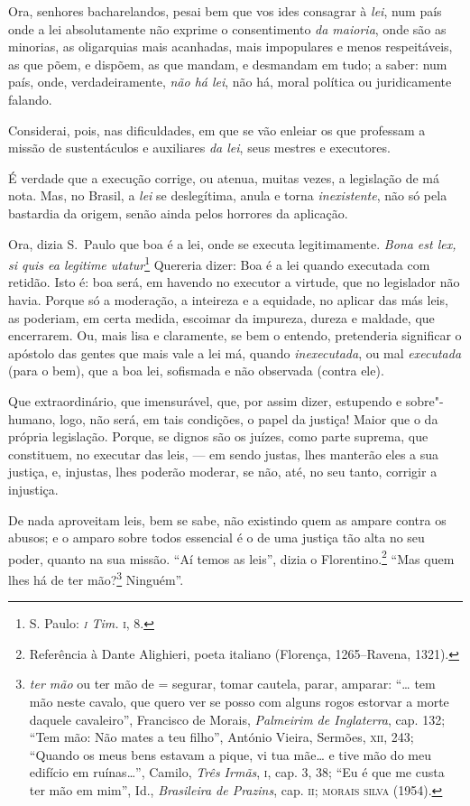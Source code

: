 Ora, senhores bacharelandos, pesai bem que vos ides consagrar à
\textit{lei}, num país onde a lei absolutamente não exprime o
consentimento \textit{da maioria}, onde são as minorias, as oligarquias
mais acanhadas, mais impopulares e menos respeitáveis, as que põem, e
dispõem, as que mandam, e desmandam em tudo; a saber: num país, onde,
verdadeiramente, \textit{não há lei}, não há, moral política ou
juridicamente falando.

Considerai, pois, nas dificuldades, em que se vão enleiar os que
professam a missão de sustentáculos e auxiliares \textit{da lei}, seus
mestres e executores.

É verdade que a execução corrige, ou atenua, muitas vezes, a
legislação de má nota. Mas, no Brasil, a \textit{lei} se deslegítima,
anula e torna \textit{inexistente}, não só pela bastardia da origem,
senão ainda pelos horrores da aplicação.

Ora, dizia S.~Paulo que boa é a lei, onde se executa legitimamente. \textit{Bona est lex,
si quis ea legitime utatur}\footnote{ S. Paulo: \textit{\textsc{i} Tim. }\textsc{i},
8.} Quereria dizer: Boa é a lei quando executada com retidão.
Isto é: boa será, em havendo no executor a virtude, que no legislador
não havia. Porque só a moderação, a inteireza e a equidade, no aplicar
das más leis, as poderiam, em certa medida, escoimar da impureza,
dureza e maldade, que encerrarem. Ou, mais lisa e claramente, se bem o
entendo, pretenderia significar o apóstolo das gentes que mais vale a
lei má, quando \textit{inexecutada}, ou mal \textit{executada} (para o
bem), que a boa lei, sofismada e não observada (contra ele).

Que extraordinário, que imensurável, que, por assim dizer,
estupendo e sobre"-humano, logo, não será, em tais condições, o papel da
justiça! Maior que o da própria legislação. Porque, se dignos são os
juízes, como parte suprema, que constituem, no executar das leis, --- em
sendo justas, lhes manterão eles a sua justiça, e, injustas, lhes
poderão moderar, se não, até, no seu tanto, corrigir a injustiça.

De nada aproveitam leis, bem se sabe, não existindo quem as ampare
contra os abusos; e o amparo sobre todos essencial é o de uma justiça
tão alta no seu poder, quanto na sua missão. ``Aí temos as
leis'', dizia o Florentino.\footnote{ Referência à Dante
Alighieri, poeta italiano (Florença, 1265--Ravena, 1321).} ``Mas quem lhes há de
ter mão?\footnote{ \textit{ter mão} ou ter mão de = segurar, tomar
cautela, parar, amparar: “\ldots{} tem mão neste cavalo, que quero ver se
posso com alguns rogos estorvar a morte daquele cavaleiro”,  Francisco
de Morais, \textit{Palmeirim de Inglaterra}, cap. 132; “Tem mão: Não
mates a teu filho”, António Vieira, Sermões, \textsc{xii}, 243; “Quando os meus
bens estavam a pique, vi tua mãe\ldots{} e tive mão do meu edifício em
ruínas\ldots{}”, Camilo, \textit{Três Irmãs}, \textsc{i}, cap. 3, 38; “Eu é que me
custa ter mão em mim”, Id., \textit{Brasileira de Prazins}, cap. \textsc{ii};
\textsc{morais silva} (1954).} Ninguém''.

